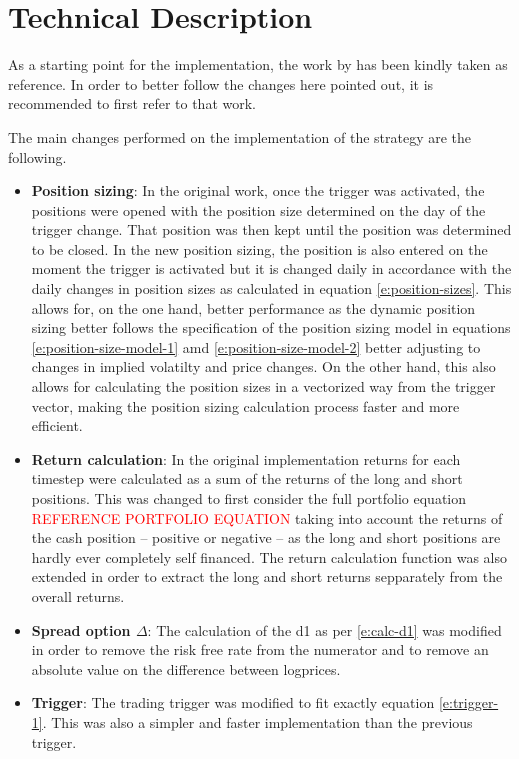 \section{Technical Description}
As a starting point for the implementation, the work by \cite{gallego_2023} has been kindly taken as reference. In order to better follow the changes here pointed out, it is recommended to first refer to that work.

The main changes performed on the implementation of the strategy are the following.

\begin{itemize}
    \item \textbf{Position sizing}: In the original work, once the trigger was activated, the positions were opened with the position size determined on the day of the trigger change. That position was then kept until the position was determined to be closed. In the new position sizing, the position is also entered on the moment the trigger is activated but it is changed daily in accordance with the daily changes in position sizes as calculated in equation \eqref{e:position-sizes}. This allows for, on the one hand, better performance as the dynamic position sizing better follows the specification of the position sizing model in equations \eqref{e:position-size-model-1} amd \eqref{e:position-size-model-2} better adjusting to changes in implied volatilty and price changes. On the other hand, this also allows for calculating the position sizes in a vectorized way from the trigger vector, making the position sizing calculation process faster and more efficient. 
    \item \textbf{Return calculation}: In the original implementation returns for each timestep were calculated as a sum of the returns of the long and short positions. This was changed to first consider the full portfolio equation \textcolor{red}{REFERENCE PORTFOLIO EQUATION} taking into account the returns of the cash position -- positive or negative -- as the long and short positions are hardly ever completely self financed. The return calculation function was also extended in order to extract the long and short returns sepparately from the overall returns. 
    \item \textbf{Spread option $\Delta$}: The calculation of the d1 as per \eqref{e:calc-d1} was modified in order to remove the risk free rate from the numerator and to remove an absolute value on the difference between logprices. 
    \item \textbf{Trigger}: The trading trigger was modified to fit exactly equation \eqref{e:trigger-1}. This was also a simpler and faster implementation than the previous trigger. 

\end{itemize}
